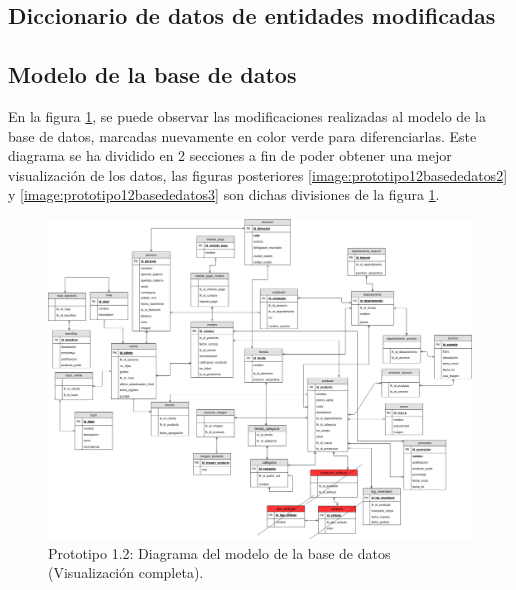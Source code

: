 \subsection{Diccionario de datos de entidades modificadas}


\subsection{Modelo de la base de datos}
En la figura \ref{image:prototipo12basededatos1}, se puede observar las modificaciones realizadas al modelo de la base de datos, marcadas nuevamente en color verde para diferenciarlas. Este diagrama se ha dividido en 2 secciones a fin de poder obtener una mejor visualización de los datos, las figuras posteriores \ref{image:prototipo12basededatos2} y \ref{image:prototipo12basededatos3} son dichas divisiones de la figura \ref{image:prototipo12basededatos1}.
\label{Modelo-BD}
\FloatBarrier
\begin{figure}[htbp!]
		\centering
			\includegraphics[width=1 \textwidth]{imagenes/modeloDatos/prototipo12/TT_Database_1}
		\caption{Prototipo 1.2: Diagrama del modelo de la base de datos (Visualización completa).}
		\label{image:prototipo12basededatos1}
\end{figure}
\FloatBarrier

